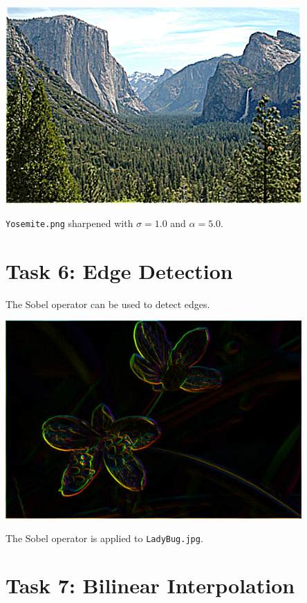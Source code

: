 \documentclass[letterpaper]{article}
\begin{document}
\begin{center}
  \includegraphics[width=0.85\textwidth]{task5.png}
  
  \texttt{Yosemite.png} sharpened with $\sigma = 1.0$ and $\alpha = 5.0$.
\end{center}

\section*{Task 6: Edge Detection}

The Sobel operator can be used to detect edges.

\begin{center}
  \includegraphics[width=0.85\textwidth]{task6.png}
  
  The Sobel operator is applied to \texttt{LadyBug.jpg}.
\end{center}

\section*{Task 7: Bilinear Interpolation}
\end{document}

